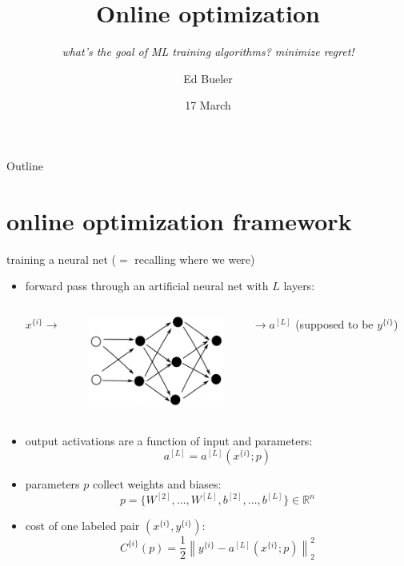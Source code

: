 \documentclass[xcolor={svgnames},
               hyperref={colorlinks,citecolor=DeepPink4,linkcolor=FireBrick,urlcolor=Maroon}]
               {beamer}
\title{Online optimization}
\subtitle{\emph{what's the goal of ML training algorithms? minimize regret!}}
\author{Ed Bueler}
\institute[UAF]{MATH 692 Mathematics for Machine Learning}
\date[Spring 2022]{17 March}
\newcommand{\RR}{\mathbb{R}}
\begin{document}
\beamertemplatenavigationsymbolsempty

\begin{frame}
  \maketitle
\end{frame}


\begin{frame}{Outline}
  \tableofcontents[hideallsubsections]
\end{frame}


\section{online optimization framework}

\begin{frame}{training a neural net ($=$ recalling where we were)}

\begin{itemize}
\item forward pass through an artificial neural net with $L$ layers:

\begin{columns}
\begin{column}{0.1\textwidth}
$x^{\{i\}}\to$ 
\end{column}
\begin{column}{0.4\textwidth}
\includegraphics[height=30mm]{figs/cleannet.png}
\end{column}
\begin{column}{0.45\textwidth}
$\to a^{[L]}$ \hfill (supposed to be $y^{\{i\}}$)
\end{column}
\end{columns}

\item output activations are a function of input and parameters:
    $$a^{[L]} = a^{[L]}(x^{\{i\}}; p)$$
\item parameters $p$ collect weights and biases:
    $$p=\{W^{[2]},\dots,W^{[L]},b^{[2]},\dots,b^{[L]}\} \in \RR^n$$
\item cost of one labeled pair $(x^{\{i\}},y^{\{i\}})$:
    $$C^{\{i\}}(p) = \frac{1}{2} \left\|y^{\{i\}} - a^{[L]}(x^{\{i\}}; p)\right\|_2^2$$
\end{itemize}
\end{frame}
\end{document}
